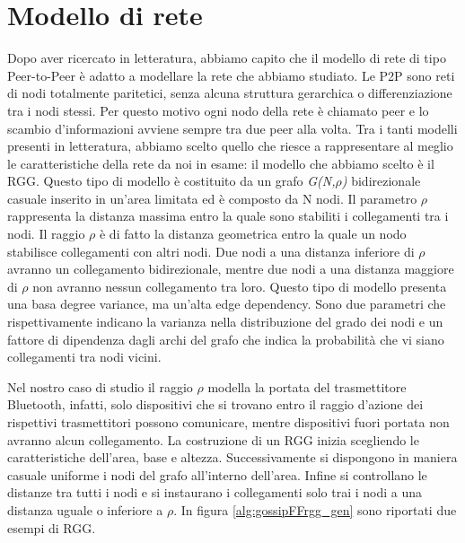 \section{Modello di rete}
Dopo aver ricercato in letteratura, abbiamo capito che il modello di rete di tipo Peer-to-Peer è adatto a modellare la rete che abbiamo studiato. Le \acs{P2P} sono reti di nodi totalmente paritetici, senza alcuna struttura gerarchica o differenziazione tra i nodi stessi. Per questo motivo ogni nodo della rete è chiamato peer e lo scambio d'informazioni avviene sempre tra due peer alla volta. Tra i tanti modelli presenti in letteratura, abbiamo scelto quello che riesce a rappresentare al meglio le caratteristiche della rete da noi in esame: il modello che abbiamo scelto è il \acf{RGG}. Questo tipo di modello è costituito da un grafo \textit{G(N,$\rho$)} bidirezionale casuale inserito in un'area limitata ed è composto da N nodi. Il parametro $\rho$ rappresenta la distanza massima entro la quale sono stabiliti i collegamenti tra i nodi. Il raggio $\rho$ è di fatto la distanza geometrica entro la quale un nodo stabilisce collegamenti con altri nodi. Due nodi a una distanza inferiore di $\rho$ avranno un collegamento bidirezionale, mentre due nodi a una distanza maggiore di $\rho$ non avranno nessun collegamento tra loro. Questo tipo di modello presenta una basa degree variance, ma un'alta edge dependency. Sono due parametri che rispettivamente indicano la varianza nella distribuzione del grado dei nodi e un fattore di dipendenza dagli archi del grafo che indica la probabilità che vi siano collegamenti tra nodi vicini.

Nel nostro caso di studio il raggio $\rho$ modella la portata del trasmettitore Bluetooth, infatti, solo dispositivi che si trovano entro il raggio d'azione dei rispettivi trasmettitori possono comunicare, mentre dispositivi fuori portata non avranno alcun collegamento. La costruzione di un \acs{RGG} inizia scegliendo le caratteristiche dell'area, base e altezza. Successivamente si dispongono in maniera casuale uniforme i nodi del grafo all'interno dell'area. Infine si controllano le distanze tra tutti i nodi e si instaurano i collegamenti solo trai i nodi a una distanza uguale o inferiore a $\rho$. In figura \ref{alg:gossipFFrgg_gen} sono riportati due esempi di \acs{RGG}.

